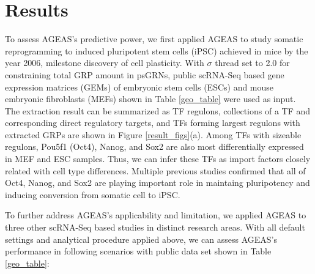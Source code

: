 \documentclass[fleqn,10pt]{wlscirep}
\begin{document}
\section*{Results}
  \label{res}
  To assess AGEAS's predictive power, we first applied AGEAS to study somatic reprogramming to induced pluripotent stem cells (iPSC) achieved in mice by the year 2006, \cite{yamanaka_2006} milestone discovery of cell plasticity. \cite{cell_repro_review}
  With $\sigma$ thread set to 2.0 for constraining total GRP amount in psGRNs, public scRNA-Seq based gene expression matrices (GEMs) of embryonic stem cells (ESCs) and mouse embryonic fibroblasts (MEFs) shown in Table \ref{geo_table} were used as input.
  The extraction result can be summarized as TF regulons, collections of a TF and corresponding direct regulatory targets, and TFs forming largest regulons with extracted GRPs are shown in Figure \ref{result_figs}(a).
  Among TFs with sizeable regulons, Pou5f1 (Oct4), Nanog, and Sox2 are also most differentially expressed in MEF and ESC samples.
  Thus, we can infer these TFs as import factors closely related with cell type differences.
  Multiple previous studies confirmed that all of Oct4, Nanog, and Sox2 are playing important role in maintaing pluripotency \cite{niwa_2007} and inducing conversion from somatic cell to iPSC. \cite{yamanaka_2006, ips7f, ipsOK, oct4_nanog_sox2_lin28, oct4_nanog_sox2}

  To further address AGEAS's applicability and limitation, we applied AGEAS to three other scRNA-Seq based studies in distinct research areas.
  With all default settings and analytical procedure applied above, we can assess AGEAS's performance in following scenarios with public data set shown in Table \ref{geo_table}:
\end{document}
